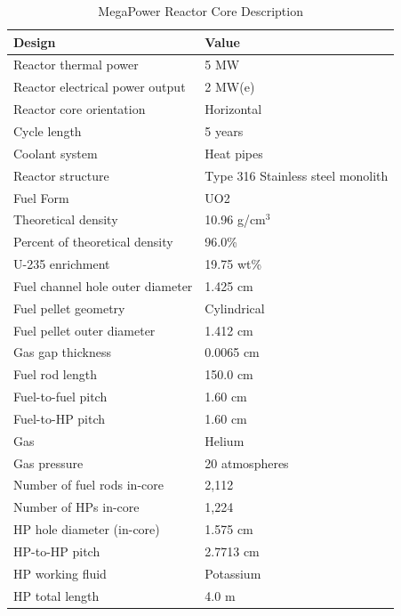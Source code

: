 \pagebreak
\begin{table} [hbtp]
\begin{center}

\caption{MegaPower Reactor Core Description}
\label{Megatable}
\begin{tabular}{l     l}
\hline 
Design 		&Value \\ 
\hline 
Reactor thermal power&5 MW                                             \\
Reactor electrical power output&2 MW(e)                                       \\
Reactor core orientation&Horizontal                                       \\
Cycle length&5 years                                           \\
Coolant system&Heat pipes                                      \\
Reactor structure&Type 316 Stainless steel monolith    \\
\hline 
Fuel Form&UO2                      \\
Theoretical density&10.96 g/cm$^3$           \\
Percent of theoretical density&96.0\%                   \\
U-235 enrichment&19.75 wt\%             \\
Fuel channel hole outer diameter&1.425 cm               \\
Fuel pellet geometry&Cylindrical              \\
Fuel pellet outer diameter&1.412 cm               \\
Gas gap thickness&0.0065 cm             \\
Fuel rod length&150.0 cm               \\
Fuel-to-fuel pitch&1.60 cm                 \\
Fuel-to-HP pitch&1.60 cm                 \\
Gas&Helium                   \\
Gas pressure&20 atmospheres   \\
Number of fuel rods in-core&2,112                     \\
\hline 
Number of HPs in-core&1,224         \\
HP hole diameter (in-core)&1.575 cm    \\
HP-to-HP pitch&2.7713 cm  \\
HP working fluid&Potassium  \\
HP total length&4.0 m         \\

\end{tabular}
\end{center}
\end{table}
